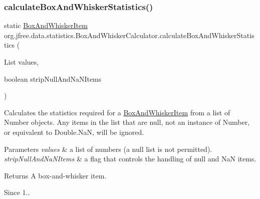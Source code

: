 \subsubsection{\texorpdfstring{calculate\+Box\+And\+Whisker\+Statistics()}{calculateBoxAndWhiskerStatistics()}\hspace{0.1cm}{\footnotesize\ttfamily [2/2]}}
{\footnotesize\ttfamily static \mbox{\hyperlink{classorg_1_1jfree_1_1data_1_1statistics_1_1_box_and_whisker_item}{Box\+And\+Whisker\+Item}} org.\+jfree.\+data.\+statistics.\+Box\+And\+Whisker\+Calculator.\+calculate\+Box\+And\+Whisker\+Statistics (\begin{DoxyParamCaption}\item[{List}]{values,  }\item[{boolean}]{strip\+Null\+And\+Na\+N\+Items }\end{DoxyParamCaption})\hspace{0.3cm}{\ttfamily [static]}}

Calculates the statistics required for a \mbox{\hyperlink{classorg_1_1jfree_1_1data_1_1statistics_1_1_box_and_whisker_item}{Box\+And\+Whisker\+Item}} from a list of {\ttfamily Number} objects. Any items in the list that are {\ttfamily null}, not an instance of {\ttfamily Number}, or equivalent to {\ttfamily Double.\+NaN}, will be ignored.


\begin{DoxyParams}{Parameters}
{\em values} & a list of numbers (a {\ttfamily null} list is not permitted). \\
\hline
{\em strip\+Null\+And\+Na\+N\+Items} & a flag that controls the handling of null and NaN items.\\
\hline
\end{DoxyParams}
\begin{DoxyReturn}{Returns}
A box-\/and-\/whisker item.
\end{DoxyReturn}
\begin{DoxySince}{Since}
1.. 
\end{DoxySince}
\mbox{\label{classorg_1_1jfree_1_1data_1_1statistics_1_1_box_and_whisker_calculator_a0298bf482027f1bdf377a80f84697364}} 
